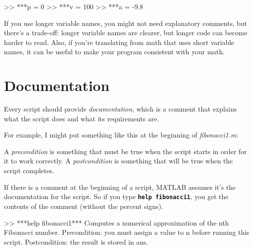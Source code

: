 \begin{code}
>> ***p = 0         %
>> ***v = 100       %
>> ***a = -9.8      %
\end{code}

If you use longer variable names, you might not need explanatory
comments, but there's a trade-off: longer variable names are clearer, but longer code can become harder
to read.
Also, if you're translating from math
that uses short variable names, it can be useful to make your
program consistent with your math.


\section{Documentation}

Every script should provide \emph{documentation}, which is a comment
that explains what the script does and what its requirements are.

For example, I might put something like this at the beginning of {\em fibonacci1.m}:


\begin{code}
\end{code}

A \emph{precondition} is something that must be true when the script
starts in order for it to work correctly.  A \emph{postcondition}
is something that will be true when the script completes.


If there is a comment at the beginning of a script, MATLAB assumes
it's the documentation for the script. So if you type \textbf{\lstinline{help
fibonacci1}}, you get the contents of the comment (without the percent
signs).

\begin{code}
>> ***help fibonacci1***
  Computes a numerical approximation of the nth Fibonacci number.  
  Precondition: you must assign a value to n before running this script.
  Postcondition: the result is stored in ans.
\end{code}

